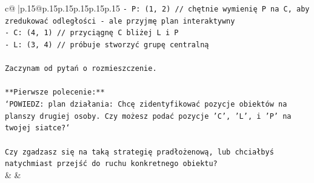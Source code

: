 \documentclass{article}
\begin{document}
{\begin{supertabular}{c@{$\;$}|p{.15\linewidth}@{}p{.15\linewidth}p{.15\linewidth}p{.15\linewidth}p{.15\linewidth}p{.15\linewidth}}
{{{\texttt{{-} P: (1, 2)  // chętnie wymienię P na C, aby zredukować odległości {-} ale przyjmę plan interaktywny} \\
\texttt{{-} C: (4, 1)  // przyciągnę C bliżej L i P} \\
\texttt{{-} L: (3, 4)  // próbuje stworzyć grupę centralną} \\
\\ 
\texttt{Zaczynam od pytań o rozmieszczenie.} \\
\\ 
\texttt{**Pierwsze polecenie:**} \\
\texttt{`POWIEDZ: plan działania: Chcę zidentyfikować pozycje obiektów na planszy drugiej osoby. Czy możesz podać pozycje 'C', 'L', i 'P' na twojej siatce?`} \\
\\ 
\texttt{Czy zgadzasz się na taką strategię pradłożenową, lub chciałbyś natychmiast przejść do ruchu konkretnego obiektu?} \\
            }
        }
    }
    & & \\ \\


\end{supertabular}}
\end{document}
